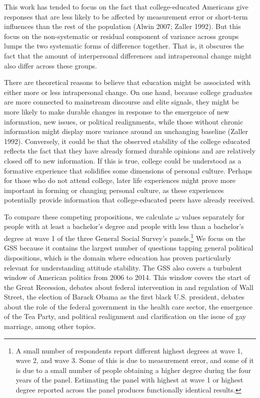 \documentclass[
  12pt,
]{article}
\begin{document}
This work has tended to focus on the fact that college-educated
Americans give responses that are less likely to be affected by
measurement error or short-term influences than the rest of the
population (Alwin 2007; Zaller 1992). But this focus on the
non-systematic or residual component of variance across groups lumps the
two systematic forms of difference together. That is, it obscures the
fact that the amount of interpersonal differences and intrapersonal
change might also differ across these groups.

There are theoretical reasons to believe that education might be
associated with either more or less intrapersonal change. On one hand,
because college graduates are more connected to mainstream discourse and
elite signals, they might be more likely to make durable changes in
response to the emergence of new information, new issues, or political
realignments, while those without chronic information might display more
variance around an unchanging baseline (Zaller 1992). Conversely, it
could be that the observed stability of the college educated reflects
the fact that they have already formed durable opinions and are
relatively closed off to new information. If this is true, college could
be understood as a formative experience that solidifies some dimensions
of personal culture. Perhaps for those who do not attend college, later
life experiences might prove more important in forming or changing
personal culture, as these experiences potentially provide information
that college-educated peers have already received.

To compare these competing propositions, we calculate \(\omega\) values
separately for people with at least a bachelor's degree and people with
less than a bachelor's degree at wave 1 of the three General Social
Survey's panels.\footnote{A small number of respondents report different
  highest degrees at wave 1, wave 2, and wave 3. Some of this is due to
  measurement error, and some of it is due to a small number of people
  obtaining a higher degree during the four years of the panel.
  Estimating the panel with highest at wave 1 or highest degree reported
  across the panel produces functionally identical results.} We focus on
the GSS because it contains the largest number of questions tapping
general political dispositions, which is the domain where education has
proven particularly relevant for understanding attitude stability. The
GSS also covers a turbulent window of American politics from 2006 to
2014. This window covers the start of the Great Recession, debates about
federal intervention in and regulation of Wall Street, the election of
Barack Obama as the first black U.S. president, debates about the role
of the federal government in the health care sector, the emergence of
the Tea Party, and political realignment and clarification on the issue
of gay marriage, among other topics.
\end{document}
